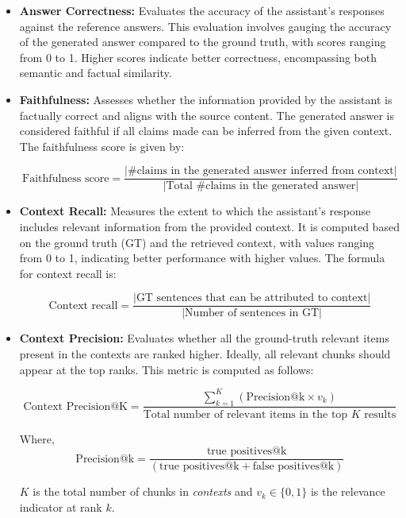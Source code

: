 \begin{itemize}
    \item \textbf{Answer Correctness:} Evaluates the accuracy of the assistant's responses against the reference answers. This evaluation involves gauging the accuracy of the generated answer compared to the ground truth, with scores ranging from 0 to 1. Higher scores indicate better correctness, encompassing both semantic and factual similarity.

    \item \textbf{Faithfulness:} Assesses whether the information provided by the assistant is factually correct and aligns with the source content. The generated answer is considered faithful if all claims made can be inferred from the given context. The faithfulness score is given by:

    \[
    \text{Faithfulness score} = \frac{\left| \text{\# claims in the generated answer inferred from context} \right|}{\left| \text{Total \# claims in the generated answer} \right|}
    \]

    \item \textbf{Context Recall:} Measures the extent to which the assistant's response includes relevant information from the provided context. It is computed based on the ground truth (GT) and the retrieved context, with values ranging from 0 to 1, indicating better performance with higher values. The formula for context recall is:

    \[
    \text{Context recall} = \frac{\left| \text{GT sentences that can be attributed to context} \right|}{\left| \text{Number of sentences in GT} \right|}
    \]

    \item \textbf{Context Precision:} Evaluates whether all the ground-truth relevant items present in the contexts are ranked higher. Ideally, all relevant chunks should appear at the top ranks. This metric is computed as follows:

    \[
    \text{Context Precision@K} = \frac{\sum_{k=1}^{K} (\text{Precision@k} \times v_k)}{\text{Total number of relevant items in the top } K \text{ results}}
    \]

    Where,
    \[
    \text{Precision@k} = \frac{\text{true positives@k}}{(\text{true positives@k} + \text{false positives@k})}
    \]

    \( K \) is the total number of chunks in \textit{contexts} and \( v_k \in \{0,1\} \) is the relevance indicator at rank \( k \).


\end{itemize}
